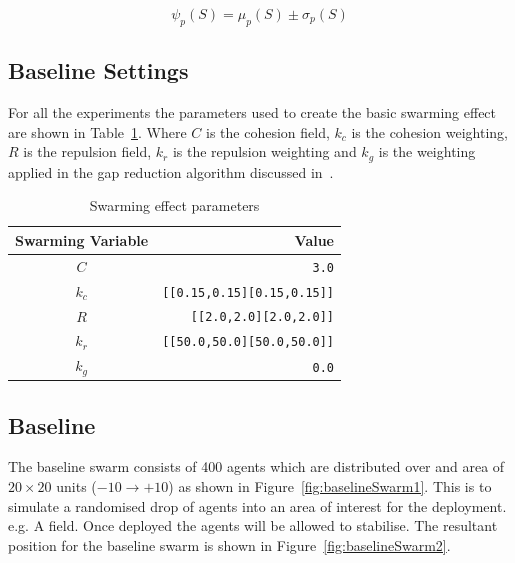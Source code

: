 \documentclass[12pt,a4paper]{IEEEtran}
\newcommand{\kc}{\mathit{k_c}}
\newcommand{\kr}{\mathit{k_r}}
\newcommand{\kg}{\mathit{k_g}}
\newcommand{\rb}{\mathit{R}}
\begin{document}
\small
\begin{equation}
\label{eq:SwarmMagnitudeMatric}
\psi_p(S) = \mu_p(S)\pm \sigma_p(S)
\end{equation}
\normalsize

\subsection{Baseline Settings}
For all the experiments the parameters used to create the basic swarming effect are shown in Table~\ref{tab:swarmingEffect}. Where $C$ is the cohesion field, $\kc$ is the cohesion weighting, $\rb$ is the repulsion field, $\kr$ is the repulsion weighting and $\kg$ is the weighting applied in the gap reduction algorithm discussed in~\cite{eliot2019void}. 

\begin{table}[H]
	\centering
	\tiny
	\begin{tabular}{|c|r|}
		\hline
		\rowcolor[HTML]{000000} 
		{\color[HTML]{FFFFFF} Swarming Variable} & {\color[HTML]{FFFFFF} Value} \\ \hline
		$C$ & \texttt{3.0} \\ \hline
		$k_c$ & \texttt{[[0.15,0.15][0.15,0.15]]}  \\ \hline
		$R$ & \texttt{[[2.0,2.0][2.0,2.0]]} \\ \hline
		$k_r$ & \texttt{[[50.0,50.0][50.0,50.0]]} \\ \hline
		$k_g$ & \texttt{0.0} \\ \hline
	\end{tabular}
	\caption{Swarming effect parameters}
	\label{tab:swarmingEffect}
\end{table}

\subsection{Baseline}
The baseline swarm consists of 400 agents which are distributed over and area of $20\times 20$ units ($-10\rightarrow+10$) as shown in Figure~\ref{fig:baselineSwarm1}. This is to simulate a randomised drop of agents into an area of interest for the deployment. e.g. A field. Once deployed the agents will be allowed to stabilise. The resultant position for the baseline swarm is shown in Figure~\ref{fig:baselineSwarm2}. 
\end{document}
